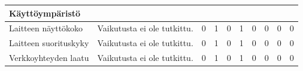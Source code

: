 \documentclass[finnish, 12pt, a4paper, elec, utf8, a-1b, online]{aaltothesis}
\begin{document}
{\begin{longtable}{p{2.5cm}|p{6cm}|p{0.5cm}p{0.5cm}p{0.5cm}|p{0.5cm}|p{0.5cm}p{0.5cm}p{0.5cm}|p{0.5cm}|}
    \midrule
    \textbf{Käyttöympäristö}                                                                                                                                                                                                                                                                                                                                                                                                                                                                                                                                                                                                                                                                          \\
    \midrule
    Laitteen näyttökoko                    & Vaikutusta ei ole tutkittu.                                                                                                                                                                                                                                                                                          & 0                                          & 1                                   & 0                                      & 1                            & 0                                               & 0                                         & 0                                         & 0                            \\
    \midrule
    Laitteen suorituskyky                  & Vaikutusta ei ole tutkittu.                                                                                                                                                                                                                                                                                          & 0                                          & 1                                   & 0                                      & 1                            & 0                                               & 0                                         & 0                                         & 0                            \\
    \midrule
    Verkkoyhteyden laatu                   & Vaikutusta ei ole tutkittu.                                                                                                                                                                                                                                                                                          & 0                                          & 1                                   & 0                                      & 1                            & 0                                               & 0                                         & 0                                         & 0                            \\

\end{longtable}}
\end{document}
